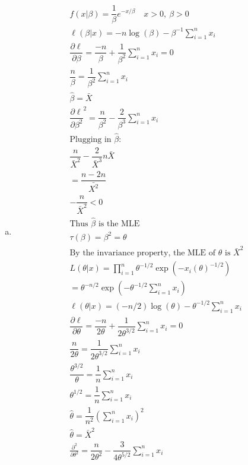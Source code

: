 \documentclass{article}
\newcommand{\pderiv}[2]{\frac{\partial #1}{\partial #2}}
\newcommand{\B}{\beta}
\newcommand{\hth}{\hat{\theta}}
\newcommand{\prodn}{\prod_{i=1}^{n}}
\newcommand{\dll}[1]{\dfrac{\partial\ell}{\partial{#1}}}
\newcommand{\sumx}{\sum_{i=1}^{n}x_i}
\newcommand{\ta}{\theta}
\begin{document}
\begin{flushleft}
\begin{enumerate}[(a)]
	\item 
\begin{multline*}\\
f(x|\B)=\dfrac{1}{\B}e^{-x/\B} \quad x>0, \ \B>0\\
\ell(\B|x)=-n\log(\B)-\B^{-1}\sumx\\
\dll{\B}=\dfrac{-n}{\B}+\dfrac{1}{\B^2}\sumx=0\\
\dfrac{n}{\B}=\dfrac{1}{\B^2}\sumx\\
\hat{\B}=\bar{X}\\
\dll{\B^2}^2=\dfrac{n}{\B^2}-\dfrac{2}{\B^3}\sumx\\
\text{Plugging in } \hat{\B}:\\
\dfrac{n}{\bar{X}^2}-\dfrac{2}{\bar{X}^3}n\bar{X}\\
=\dfrac{n-2n}{\bar{X^2}}\\
-\dfrac{n}{\bar{X}^2}<0\\
\text{Thus } \hat{\B} \text{ is the MLE}\\
\tau(\B)=\B^2=\ta\\
\text{By the invariance property, the MLE of } \ta \text{ is } \bar{X}^2\\
L(\ta|x)=\prodn\ta^{-1/2}\exp(-x_i(\ta)^{-1/2})\\
=\ta^{-n/2}\exp\left(-\ta^{-1/2}\sumx\right)\\
\ell(\ta|x)=(-n/2)\log(\ta)-\ta^{-1/2}\sumx\\
\dll{\ta}=\dfrac{-n}{2\ta}+\dfrac{1}{2\ta^{3/2}}\sumx=0\\
\dfrac{n}{2\ta}=\dfrac{1}{2\ta^{3/2}}\sumx\\
\dfrac{\ta^{3/2}}{\ta}=\dfrac{1}{n}\sumx\\
\ta^{1/2}=\dfrac{1}{n}\sumx\\
\hth=\dfrac{1}{n^2}\left(\sumx\right)^2\\
\hth=\bar{X}^2\\
\pderiv{^2}{\ta^2}=\dfrac{n}{2\ta^2}-\dfrac{3}{4\ta^{5/2}}\sumx\\
\end{multline*}


\end{enumerate}
\end{flushleft}
\end{document}
